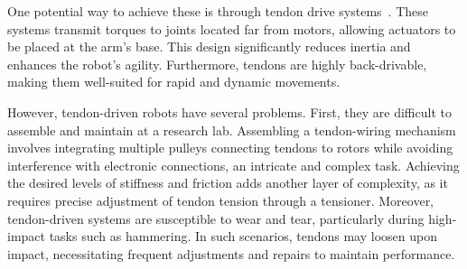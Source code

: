 
One potential way to achieve these is through tendon drive systems~\cite{song2018development, quigley2011low, guist2024safe}. These systems transmit torques to joints located far from motors, allowing actuators to be placed at the arm's base. This design significantly reduces inertia and enhances the robot's agility. Furthermore, tendons are highly back-drivable, making them well-suited for rapid and dynamic movements.

However, tendon-driven robots have several problems. First, they are difficult to assemble and maintain at a research lab. Assembling a tendon-wiring mechanism involves integrating multiple pulleys connecting tendons to rotors while avoiding interference with electronic connections, an intricate and complex task. Achieving the desired levels of stiffness and friction adds another layer of complexity, as it requires precise adjustment of tendon tension through a tensioner. Moreover, tendon-driven systems are susceptible to wear and tear, particularly during high-impact tasks such as hammering. In such scenarios, tendons may loosen upon impact, necessitating frequent adjustments and repairs to maintain performance.




